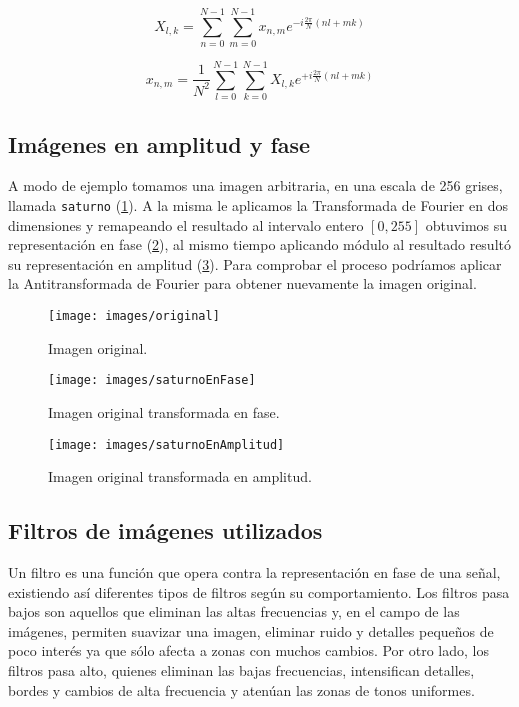 \documentclass{article}
\begin{document}
\begin{multicols}{2}
\begin{equation}
\label{transform}
X_{l,k} = \sum_{n=0}^{N-1}\sum_{m=0}^{N-1} x_{n,m} e^{-i\frac{2\pi}{N}(nl + mk)}
\end{equation}

\begin{equation}
\label{antitransform}
x_{n,m} = \frac{1}{N^2} \sum_{l=0}^{N-1}\sum_{k=0}^{N-1} X_{l,k} e^{+i\frac{2\pi}{N}(nl + mk)}
\end{equation}

\subsection{Imágenes en amplitud y fase}
\label{sec2}


\par A modo de ejemplo tomamos una imagen arbitraria, en una escala de 256 grises, llamada \verb+saturno+ (\ref{saturno}). A la misma le aplicamos la Transformada de Fourier en dos dimensiones y remapeando el resultado al intervalo entero $[0,255]$ obtuvimos su representación en fase (\ref{saturnoPhase}), al mismo tiempo aplicando módulo al resultado resultó su representación en amplitud (\ref{saturnoAmplitude}). Para comprobar el proceso podríamos aplicar la Antitransformada de Fourier para obtener nuevamente la imagen original.

\begin{figure}[H]
\centering
\texttt{[image: images/original]}
\caption{Imagen original.}
\label{saturno}
\end{figure}

\begin{figure}[H]
\centering
\texttt{[image: images/saturnoEnFase]}
\caption{Imagen original transformada en fase.}
\label{saturnoPhase}
\end{figure}

\begin{figure}[H]
\centering
\texttt{[image: images/saturnoEnAmplitud]}
\caption{Imagen original transformada en amplitud.}
\label{saturnoAmplitude}
\end{figure}

\par 

\subsection{Filtros de imágenes utilizados}
\label{sec3}
\par Un filtro es una función que opera contra la representación en fase de una señal, existiendo así diferentes tipos de filtros según su comportamiento. Los filtros pasa bajos son aquellos que eliminan las altas frecuencias y, en el campo de las imágenes, permiten suavizar una imagen, eliminar ruido y detalles pequeños de poco interés ya que sólo afecta a zonas con muchos cambios. Por otro lado, los filtros pasa alto, quienes eliminan las bajas frecuencias, intensifican detalles, bordes y cambios de alta frecuencia y atenúan las zonas de tonos uniformes.


\end{multicols}
\end{document}
